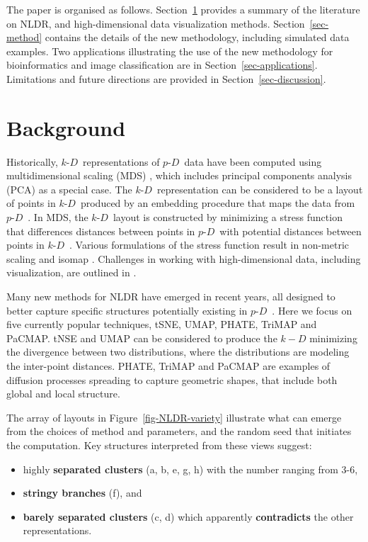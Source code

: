 \documentclass[
  12pt]{article}
\providecommand{\tightlist}{%
  \setlength{\itemsep}{0pt}\setlength{\parskip}{0pt}}\usepackage{longtable,booktabs,array}
\def\tightlist{}
\newcommand\pD{$p\text{-}D$\ }
\newcommand\kD{$k\text{-}D$\ }
\begin{document}
The paper is organised as follows. Section~\ref{sec-background} provides
a summary of the literature on NLDR, and high-dimensional data
visualization methods. Section~\ref{sec-method} contains the details of
the new methodology, including simulated data examples. Two applications
illustrating the use of the new methodology for bioinformatics and image
classification are in Section~\ref{sec-applications}. Limitations and
future directions are provided in Section~\ref{sec-discussion}.

\section{Background}\label{sec-background}

Historically, \kD representations of \pD data have been computed using
multidimensional scaling (MDS) \citep{borg2005}, which includes
principal components analysis (PCA) \citep{jolliffe2011} as a special
case. The \kD representation can be considered to be a layout of points
in \kD produced by an embedding procedure that maps the data from \pD.
In MDS, the \kD layout is constructed by minimizing a stress function
that differences distances between points in \pD with potential
distances between points in \kD. Various formulations of the stress
function result in non-metric scaling \citep{saeed2018} and isomap
\citep{silva2002}. Challenges in working with high-dimensional data,
including visualization, are outlined in \citet{johnstone2009}.

Many new methods for NLDR have emerged in recent years, all designed to
better capture specific structures potentially existing in \pD. Here we
focus on five currently popular techniques, tSNE, UMAP, PHATE, TriMAP
and PaCMAP. tNSE and UMAP can be considered to produce the \(k-D\)
minimizing the divergence between two distributions, where the
distributions are modeling the inter-point distances. PHATE, TriMAP and
PaCMAP are examples of diffusion processes \citep{coifman2005} spreading
to capture geometric shapes, that include both global and local
structure.

The array of layouts in Figure~\ref{fig-NLDR-variety} illustrate what
can emerge from the choices of method and parameters, and the random
seed that initiates the computation. Key structures interpreted from
these views suggest:

\begin{itemize}
\tightlist
\item
  highly \textbf{separated clusters} (a, b, e, g, h) with the number
  ranging from 3-6,
\item
  \textbf{stringy branches} (f), and
\item
  \textbf{barely separated clusters} (c, d) which apparently
  \textbf{contradicts} the other representations.
\end{itemize}
\end{document}
